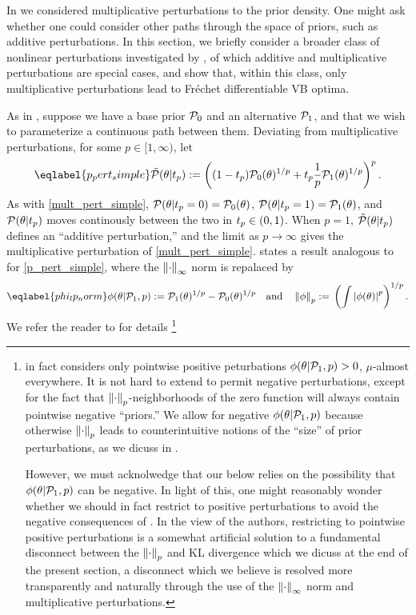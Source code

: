 In  we considered multiplicative perturbations to
the prior density.  One might ask whether one could consider other paths through
the space of priors, such as additive perturbations.  In this section, we
briefly consider a broader class of nonlinear perturbations investigated by
\citet{gustafson:1996:local}, of which additive and multiplicative perturbations
are special cases, and show that, within this class, only multiplicative
perturbations lead to Fr{\'e}chet differentiable VB optima.

As in , suppose we have a base prior $\mathcal{P}_{0}$ and
an alternative $\mathcal{P}_{1}$, and that we wish to parameterize a continuous path
between them.  Deviating from multiplicative perturbations, for some $p \in [1,
\infty)$, let
%
\begin{align}\eqlabel{p_pert_simple}
%
\ptil(\theta \vert \tp) :=
    \left((1 - \tp)\pbase(\theta)^{1/p} +
    \tp \frac{1}{p}\palt(\theta)^{1/p} \right)^{p}.
%
\end{align}
%
As with \eqref{mult_pert_simple}, $\mathcal{P}(\theta \vert t_{p} = 0) = \mathcal{P}_{0}(\theta)$,
$\mathcal{P}(\theta \vert t_{p} = 1) = \mathcal{P}_{1}(\theta)$, and $\mathcal{P}(\theta \vert t_{p})$ moves
continously between the two in $t_{p} \in (0, 1)$.  When $p = 1$,
$\tilde{\mathcal{P}}(\theta \vert t_{p})$ defines an ``additive perturbation,'' and
the limit as $p \rightarrow \infty$ gives the multiplicative perturbation
of \eqref{mult_pert_simple}.
%
\citet[Result 2]{gustafson:1996:local} states
a result analogous to  for \eqref{p_pert_simple}, where
the $\left\Vert\cdot\right\Vert_{\infty}$ norm is repalaced by
%
\begin{align}\eqlabel{phi_lp_norm}
%
\phi(\theta \vert \palt, p) :={}
    \palt(\theta)^{1/p} - \pbase(\theta)^{1/p} \mathand
\norm{\phi}_p :={} \left(\int \abs{\phi(\theta)}^p \right)^{1/p}.
%
\end{align}
%
We refer the reader to \citet{gustafson:1996:local} for details
%
\footnote{\citet{gustafson:1996:local} in fact considers only pointwise positive
peturbations $\phi(\theta \vert \mathcal{P}_{1}, p) > 0$, $\mu$-almost everywhere.  It is
not hard to extend  \citet[Result
2]{gustafson:1996:local} to permit negative perturbations, except for the fact
that $\left\Vert\cdot\right\Vert_p$-neighborhoods of the zero function will always contain
pointwise negative ``priors.''
%
We allow for negative $\phi(\theta \vert \mathcal{P}_{1}, p)$ because otherwise
$\left\Vert\cdot\right\Vert_p$ leads to counterintuitive notions of the ``size'' of prior
perturbations, as we dicuss in .

However, we must acknolwedge that our  below relies on
the possibility that $\phi(\theta \vert \mathcal{P}_{1}, p)$ can be negative.   In light
of this, one might reasonably wonder whether we should in fact restrict to
positive perturbations to avoid the negative consequences of
. In the view of the authors, restricting to pointwise
positive perturbations is a somewhat artificial solution to a fundamental
disconnect between the $\left\Vert\cdot\right\Vert_p$ and KL divergence which we dicuss at the
end of the present section, a disconnect which we believe is resolved more
transparently and naturally through the use of the $\left\Vert\cdot\right\Vert_{\infty}$ norm and
multiplicative perturbations. }
